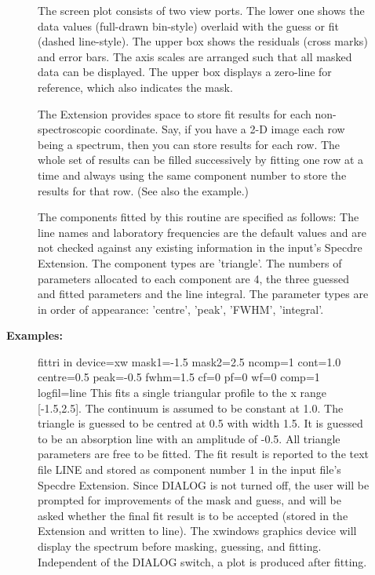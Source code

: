 \begin{description}
\begin{description}
\begin{terminalv}
   The screen plot consists of two view ports. The lower one shows the
   data values (full-drawn bin-style) overlaid with the guess or fit
   (dashed line-style). The upper box shows the residuals (cross
   marks) and error bars. The axis scales are arranged such that
   all masked data can be displayed. The upper box displays a
   zero-line for reference, which also indicates the mask.

   The Extension provides space to store fit results for each
   non-spectroscopic coordinate. Say, if you have a 2-D image each
   row being a spectrum, then you can store results for each row. The
   whole set of results can be filled successively by fitting one row
   at a time and always using the same component number to store the
   results for that row. (See also the example.)

   The components fitted by this routine are specified as follows:
   The line names and laboratory frequencies are the default values
   and are not checked against any existing information in the
   input's Specdre Extension. The component types are 'triangle'. The
   numbers of parameters allocated to each component are 4, the
   three guessed and fitted parameters and the line integral. The
   parameter types are in order of appearance: 'centre', 'peak',
   'FWHM', 'integral'.
\end{terminalv}

\item [\textbf{Examples:}]
\begin{terminalv}
fittri in device=xw mask1=-1.5 mask2=2.5
      ncomp=1 cont=1.0 centre=0.5 peak=-0.5 fwhm=1.5 cf=0 pf=0 wf=0
      comp=1 logfil=line
   This fits a single triangular profile to the x range
   [-1.5,2.5]. The continuum is assumed to be constant at 1.0. The
   triangle is guessed to be centred at 0.5 with width 1.5. It is
   guessed to be an absorption line with an amplitude of -0.5.
   All triangle parameters are free to be fitted. The fit result
   is reported to the text file LINE and stored as component
   number 1 in the input file's Specdre Extension.
   Since DIALOG is not turned off, the user will be prompted for
   improvements of the mask and guess, and will be asked whether
   the final fit result is to be accepted (stored in the Extension
   and written to line).
   The xwindows graphics device will display the spectrum before
   masking, guessing, and fitting. Independent of the DIALOG
   switch, a plot is produced after fitting.


\end{terminalv}
\end{description}
\end{description}

